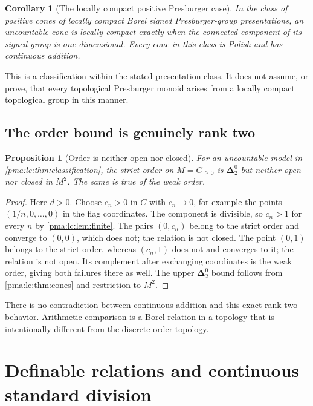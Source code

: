 \documentclass[11pt]{article}
\numberwithin{equation}{section}
\newtheorem{proposition}[proposition]{Proposition}
\newtheorem{corollary}[corollary]{Corollary}
\theoremstyle{definition}
\theoremstyle{remark}
\newcommand{\Dtwo}{\boldsymbol{\Delta}^{0}_{2}}
\begin{document}
\begin{corollary}[The locally compact positive Presburger case]
\label{pma:lc:cor:positiveclass}
In the class of positive cones of locally compact Borel signed
Presburger-group presentations, an uncountable cone is locally compact
exactly when the connected component of its signed group is one-dimensional.
Every cone in this class is Polish and has continuous addition.
\end{corollary}

This is a classification within the stated presentation class. It does
not assume, or prove, that every topological Presburger monoid arises
from a locally compact topological group in this manner.

\subsection{The order bound is genuinely rank two}
\begin{proposition}[Order is neither open nor closed]\label{pma:lc:prop:exactrank}
For an uncountable model in \cref{pma:lc:thm:classification}, the strict order
on $M=G_{\ge0}$ is $\Dtwo$ but neither open nor closed in $M^2$.
The same is true of the weak order.
\end{proposition}
\begin{proof}
Here $d>0$. Choose $c_n>0$ in $C$ with $c_n\to0$, for example the
points $(1/n,0,\ldots,0)$ in the flag coordinates. The component is
divisible, so $c_n>1$ for every $n$ by \cref{pma:lc:lem:finite}.
The pairs $(0,c_n)$ belong to the strict order and converge to $(0,0)$,
which does not; the relation is not closed. The point $(0,1)$ belongs
to the strict order, whereas $(c_n,1)$ does not and converges to it;
the relation is not open. Its complement after exchanging coordinates
is the weak order, giving both failures there as well. The upper
$\Dtwo$ bound follows from \cref{pma:lc:thm:cones} and restriction to $M^2$.
\end{proof}

There is no contradiction between continuous addition and this exact
rank-two behavior. Arithmetic comparison is a Borel relation in a topology
that is intentionally different from the discrete order topology.

\section{Definable relations and continuous standard division}
\label{pma:lc:sec:definability}
\end{document}
